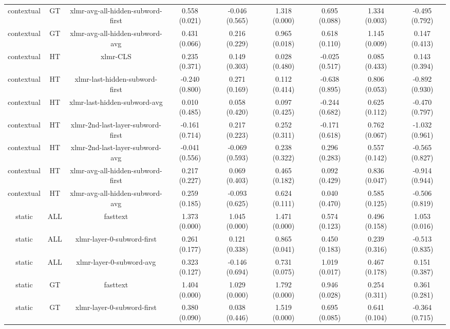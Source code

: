 \begin{sidewaystable}[htb]
\begin{tabular}{@{}ccccccccc@{}}
        contextual & GT & xlmr-avg-all-hidden-subword-first & 0.558 (0.021) & -0.046 (0.565) & 1.318 (0.000) & 0.695 (0.088) & 1.334 (0.003) & -0.495 (0.792) \\
        contextual & GT & xlmr-avg-all-hidden-subword-avg & 0.431 (0.066) & 0.216 (0.229) & 0.965 (0.018) & 0.618 (0.110) & 1.145 (0.009) & 0.147 (0.413) \\
        contextual & HT & xlmr-CLS & 0.235 (0.371) & 0.149 (0.303) & 0.028 (0.480) & -0.025 (0.517) & 0.085 (0.433) & 0.143 (0.394) \\
        contextual & HT & xlmr-last-hidden-subword-first & -0.240 (0.800) & 0.271 (0.169) & 0.112 (0.414) & -0.638 (0.895) & 0.806 (0.053) & -0.892 (0.930) \\
        contextual & HT & xlmr-last-hidden-subword-avg & 0.010 (0.485) & 0.058 (0.420) & 0.097 (0.425) & -0.244 (0.682) & 0.625 (0.112) & -0.470 (0.797) \\
        contextual & HT & xlmr-2nd-last-layer-subword-first & -0.161 (0.714) & 0.217 (0.223) & 0.252 (0.311) & -0.171 (0.618) & 0.762 (0.067) & -1.032 (0.961) \\
        contextual & HT & xlmr-2nd-last-layer-subword-avg & -0.041 (0.556) & -0.069 (0.593) & 0.238 (0.322) & 0.296 (0.283) & 0.557 (0.142) & -0.565 (0.827) \\
        contextual & HT & xlmr-avg-all-hidden-subword-first & 0.217 (0.227) & 0.069 (0.403) & 0.465 (0.182) & 0.092 (0.429) & 0.836 (0.047) & -0.914 (0.944) \\
        contextual & HT & xlmr-avg-all-hidden-subword-avg & 0.259 (0.185) & -0.093 (0.625) & 0.624 (0.111) & 0.040 (0.470) & 0.585 (0.125) & -0.506 (0.819) \\
        static & ALL & fasttext & 1.373 (0.000) & 1.045 (0.000) & 1.471 (0.000) & 0.574 (0.123) & 0.496 (0.158) & 1.053 (0.016) \\
        static & ALL & xlmr-layer-0-subword-first & 0.261 (0.177) & 0.121 (0.338) & 0.865 (0.041) & 0.450 (0.183) & 0.239 (0.316) & -0.513 (0.835) \\
        static & ALL & xlmr-layer-0-subword-avg & 0.323 (0.127) & -0.146 (0.694) & 0.731 (0.075) & 1.019 (0.017) & 0.467 (0.178) & 0.151 (0.387) \\
        static & GT & fasttext & 1.404 (0.000) & 1.029 (0.000) & 1.792 (0.000) & 0.946 (0.028) & 0.254 (0.311) & 0.361 (0.281) \\
        static & GT & xlmr-layer-0-subword-first & 0.380 (0.090) & 0.038 (0.446) & 1.519 (0.000) & 0.695 (0.085) & 0.641 (0.104) & -0.364 (0.715) \\

\end{tabular}
\end{sidewaystable}

